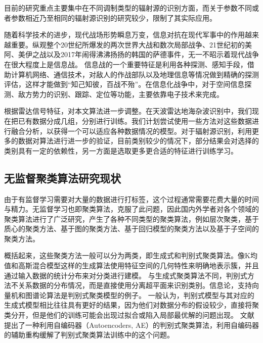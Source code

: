 


目前的研究重点主要集中在不同调制类型的辐射源的识别方面，而关于参数不同或者参数相近乃至相同的辐射源识别的研究较少，限制了其实际应用。


随着科学技术的进步，现代战场形势瞬息万变，信息对抗在现代军事中的作用越来越重要。纵观整个20世纪所爆发的两次世界大战和数次局部战争、21世纪初的美阿、美伊之战以及2017年闹得沸沸扬扬的韩国的萨德事件，无一不昭示着现代战争在很大程度上是信息战。
信息战的一个重要特征是利用各种探测、感知手段，借助计算机网络、通信技术，对敌人的作战部队以及地理信息等情况做到精确的探测评估，这样才能做到“知己知彼，百战不殆”。在信息化战争中，对于空间信息探测、敌方势力的识别、跟踪、定位等功能，主要依靠电子技术来完成。

\item 根据雷达信号特征，对本文算法进一步调整。在天波雷达地海杂波识别中，我们现在把已有数据分成几组，分别进行训练。我们计划尝试使用一些方法对这些数据进行融合分析，以获得一个可以适应各种数据情况的模型。对于辐射源识别，利用更多的数据对算法进行进一步的验证，目前类别较少的情况下，部分结果会对选择的类别具有一定的依赖性，另一方面是选取更多更合适的特征进行训练学习。



\subsection{无监督聚类算法研究现状}
由于有监督学习需要对大量的数据进行打标签，这个过程通常需要花费大量的时间与精力。无监督学习也即聚类算法，克服了此问题，因此国内外学者对各个领域的聚类算法进行了广泛研究，产生了各种不同类型的聚类算法，例如层次聚类，基于质心的聚类方法、基于图的聚类方法、基于回归模型的聚类方法以及基于子空间的聚类方法。

概括起来，这些聚类方法一般可以分为两类，即生成式和判别式聚类算法。像K均值和高斯混合模型这样的生成算法使用特征空间的几何特性来明确地表示簇，并且通过输入数据的统计分布来对分类进行建模。
与生成式聚类算法不同，判别式方法不关系数据的分布情况，而是直接使用分离超平面来识别类别。信息论，支持向量机和图谱论算法是判别式聚类模型的例子。
一般认为，判别式模型与其对应的生成式模型相比往往具有更好的结果，因为他们对数据分布的假设较少，直接将聚类分开，但是他们的训练可能会出现过拟合或陷入局部最优解的问题出现。
文献\cite{xie2016unsupervised}提出了一种利用自编码器（Autoencoders, AE）的判别式聚类算法，利用自编码器的辅助重构缓解了判别式聚类算法训练中的这个问题。

